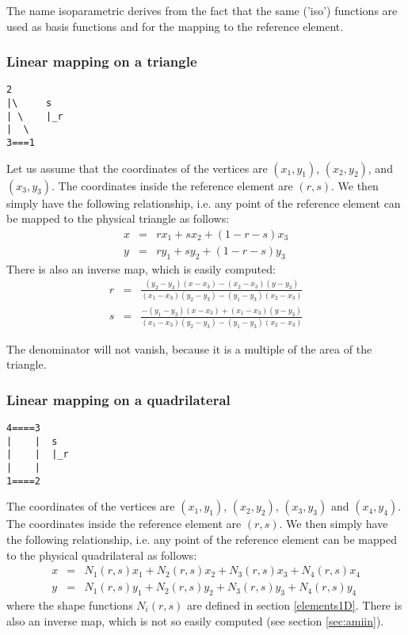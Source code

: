
The name isoparametric derives from the fact that the same ('iso') 
functions are used as basis functions and for the mapping to the reference element.


\subsubsection{Linear mapping on a triangle}

\begin{verbatim}
2
|\     s
| \    |_r
|  \
3===1
\end{verbatim}

Let us assume that the coordinates of the vertices are 
$(x_1,y_1)$,  
$(x_2,y_2)$, and 
$(x_3,y_3)$.
The coordinates inside the reference element are $(r,s)$. We then simply have the 
following relationship, i.e. any point of the reference element 
can be mapped to the physical triangle as follows:
\begin{eqnarray}
x&=& r x_1 + s x_2 + (1-r-s) x_3 \\
y&=& r y_1 + s y_2 + (1-r-s) y_3 
\end{eqnarray} 
There is also an inverse map, which is easily computed:
\begin{eqnarray}
r&=& \frac{(y_2-y_3)(x-x_3)-(x_2-x_3)(y-y_3)}{(x_1-x_3)(y_2-y_3)-(y_1-y_3)(x_2-x_3)} \\
s&=& \frac{-(y_1-y_3)(x-x_3)+(x_1-x_3)(y-y_3)}{(x_1-x_3)(y_2-y_3)-(y_1-y_3)(x_2-x_3)} 
\end{eqnarray} 
\begin{remark}
The denominator will not vanish, because it is a multiple of the area of the triangle.
\end{remark}

\subsubsection{Linear mapping on a quadrilateral}

\begin{verbatim}
4====3
|    |  s
|    |  |_r
|    |
1====2
\end{verbatim}

The coordinates of the vertices are 
$(x_1,y_1)$, $(x_2,y_2)$, $(x_3,y_3)$ and $(x_4,y_4)$.
The coordinates inside the reference element are $(r,s)$. We then simply have the 
following relationship, i.e. any point of the reference element 
can be mapped to the physical quadrilateral as follows:
\begin{eqnarray}
x&=& N_1(r,s) x_1 + N_2(r,s) x_2 + N_3(r,s) x_3 + N_4(r,s) x_4 \\
y&=& N_1(r,s) y_1 + N_2(r,s) y_2 + N_3(r,s) y_3 + N_4(r,s) y_4 
\end{eqnarray} 
where the shape functions $N_i(r,s)$ are defined in section \ref{elements1D}.
There is also an inverse map, which is not so easily computed (see section \ref{sec:amiin}).

